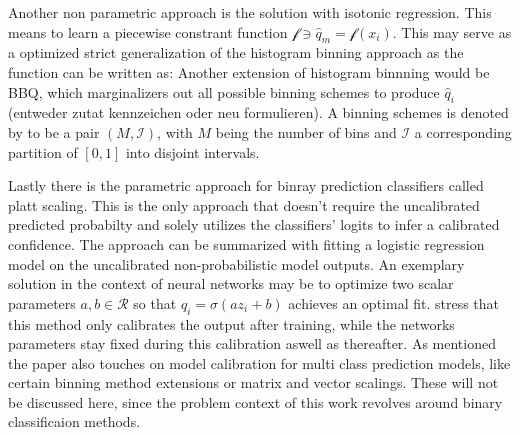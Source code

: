 Another non parametric approach is the solution with isotonic regression. This means to learn a piecewise constrant function $\mathcal{f} \ni \hat{q}_m = \mathcal{f}(x_i)$. This may serve as a 
optimized strict generalization of the histogram binning approach as the function can be written as: %
Another extension of histogram binnning would be BBQ, which marginalizers out all possible binning schemes to produce $\hat{q}_i$ (entweder zutat kennzeichen oder neu formulieren). A binning schemes 
is denoted by \cite{Guo_2017_tempscalingetc} to be a pair $(M, \mathcal{I})$, with $M$ being the number of bins and $\mathcal{I}$ a corresponding partition of $[0, 1]$ into disjoint intervals. 


Lastly there is the parametric approach for binray prediction classifiers called platt scaling. This is the only approach that doesn't require the uncalibrated predicted probabilty and solely utilizes 
the classifiers' logits to infer a calibrated confidence. The approach can be summarized with fitting a logistic regression model on the uncalibrated non-probabilistic model outputs. An exemplary 
solution in the context of neural networks may be to optimize two scalar parameters $a, b \in \mathcal{R}$ so that $\hat{q}_i = \sigma(az_i + b)$ achieves an optimal fit. \cite{Guo_2017_tempscalingetc} 
stress that this method only calibrates the output after training, while the networks parameters stay fixed during this calibration aswell as thereafter.
\newline
As mentioned the paper also touches on model calibration for multi class prediction models, like certain binning method extensions or matrix and vector scalings. These will not be discussed here, 
since the problem context of this work revolves around binary classificaion methods.


